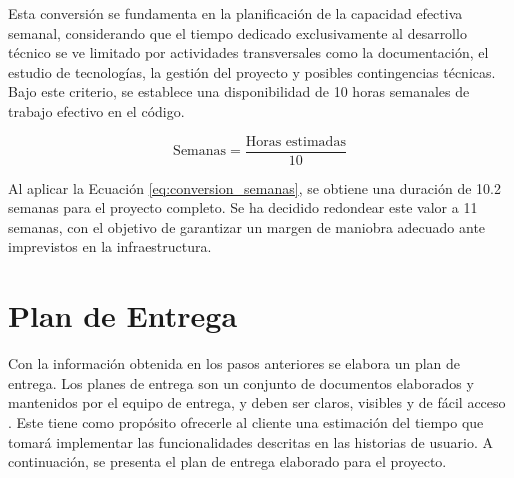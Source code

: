 Esta conversión se fundamenta en la planificación de la capacidad efectiva semanal, considerando que el tiempo 
dedicado exclusivamente al desarrollo técnico se ve limitado por actividades transversales como la documentación, 
el estudio de tecnologías, la gestión del proyecto y posibles contingencias técnicas. Bajo este criterio, se 
establece una disponibilidad de 10 horas semanales de trabajo efectivo en el código.

\begin{equation}
\text{Semanas} = \frac{\text{Horas estimadas}}{10}
\label{eq:conversion_semanas}
\end{equation}

Al aplicar la Ecuación \ref{eq:conversion_semanas}, se obtiene una duración de 10.2 semanas para el proyecto completo. 
Se ha decidido redondear este valor a 11 semanas, con el objetivo de garantizar un margen de maniobra adecuado ante 
imprevistos en la infraestructura.
 

\section{Plan de Entrega}

Con la información obtenida en los pasos anteriores se elabora un plan de entrega. Los planes de
entrega son un conjunto de documentos elaborados y mantenidos por el equipo de entrega, y deben ser
claros, visibles y de fácil acceso \citep{Cohn2005}. Este tiene como propósito
ofrecerle al cliente una estimación del tiempo que tomará implementar las funcionalidades descritas en
las historias de usuario. A continuación, se presenta el plan de entrega elaborado para el proyecto.

